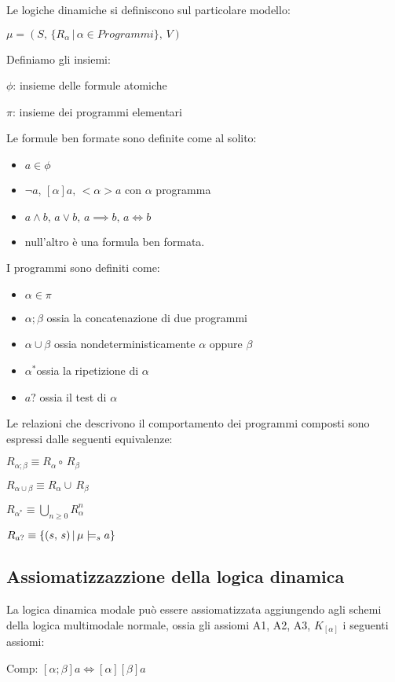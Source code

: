 Le logiche dinamiche si definiscono sul particolare modello:

$\mu=(S,\,\{R_{\alpha}\,|\,\alpha\in Programmi\},\, V)$

Definiamo gli insiemi:

$\phi$: insieme delle formule atomiche

$\pi$: insieme dei programmi elementari

Le formule ben formate sono definite come al solito:
\begin{itemize}
\item $a\in\phi$
\item $\neg a,\,[\alpha]a,\,<\alpha>a$ con $\alpha$ programma
\item $a\wedge b,\, a\vee b,\, a\implies b,\, a\iff b$
\item null'altro è una formula ben formata.
\end{itemize}
I programmi sono definiti come:
\begin{itemize}
\item $\alpha\in\pi$
\item $\alpha;\beta$ ossia la concatenazione di due programmi
\item $\alpha\cup\beta$ ossia nondeterministicamente $\alpha$ oppure $\beta$
\item $\alpha^{*}$ossia la ripetizione di $\alpha$
\item $a?$ ossia il test di $\alpha$
\end{itemize}
Le relazioni che descrivono il comportamento dei programmi composti
sono espressi dalle seguenti equivalenze:

$R_{\alpha;\beta}\equiv R_{\alpha}\circ\, R_{\beta}$

$R_{\alpha\cup\beta}\equiv R_{\alpha}\cup\, R_{\beta}$

$R_{\alpha^{*}}\equiv\underset{n\geq0}{\bigcup}R_{\alpha}^{n}$

$R_{a?}\equiv\{(s,\, s)\,|\,\mu\models_{s}a\}$


\subsection{Assiomatizzazzione della logica dinamica}

La logica dinamica modale può essere assiomatizzata aggiungendo agli
schemi della logica multimodale normale, ossia gli assiomi A1, A2,
A3, $K_{[\alpha]}$ i seguenti assiomi:

Comp: $[\alpha;\beta]a\iff[\alpha][\beta]a$


